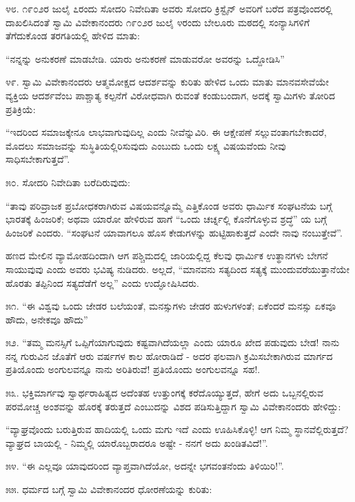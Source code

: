 ೪೮. ೧೯೦೨ರ ಜುಲೈ ೭ರಂದು ಸೋದರಿ ನಿವೇದಿತಾ ಅವರು ಸೋದರಿ ಕ್ರಿಸ್ಟೈನ್ ಅವರಿಗೆ ಬರೆದ ಪತ್ರವೊಂದರಲ್ಲಿ ದಾಖಲಿಸಿದಂತೆ ಸ್ವಾಮಿ ವಿವೇಕಾನಂದರು ೧೯೦೨ರ ಜುಲೈ ೪ರಂದು ಬೇಲೂರು ಮಠದಲ್ಲಿ ಸಂನ್ಯಾಸಿಗಳಿಗೆ ತೆಗೆದುಕೊಂಡ ತರಗತಿಯಲ್ಲಿ ಹೇಳಿದ ಮಾತು:

“ನನ್ನನ್ನು ಅನುಕರಣೆ ಮಾಡಬೇಡಿ. ಯಾರು ಅನುಕರಣೆ ಮಾಡುವರೋ ಅವರನ್ನು ಒದ್ದೋಡಿಸಿ” 

೪೯. ಸ್ವಾಮಿ ವಿವೇಕಾನಂದರು ಆತ್ಮಮೋಕ್ಷದ ಆದರ್ಶವನ್ನು ಕುರಿತು ಹೇಳಿದ ಒಂದು ಮಾತು ಮಾನವಸೇವೆಯೇ ವ್ಯಕ್ತಿಯ ಆದರ್ಶವೆಂಬ ಪಾಶ್ಚಾತ್ಯ ಕಲ್ಪನೆಗೆ ವಿರೋಧವಾಗಿ ರುವಂತೆ ಕಂಡುಬಂದಾಗ, ಅದಕ್ಕೆ ಸ್ವಾಮಿಗಳು ತೋರಿದ ಪ್ರತಿಕ್ರಿಯೆ:

“ಇದರಿಂದ ಸಮಾಜಕ್ಕೇನೂ ಲಾಭವಾಗುವುದಿಲ್ಲ ಎಂದು ನೀವೆನ್ನುವಿರಿ. ಈ ಆಕ್ಷೇಪಣೆ ಸಲ್ಲುವಂತಾಗಬೇಕಾದರೆ, ಮೊದಲು ಸಮಾಜವನ್ನು ಸುಸ್ಥಿತಿಯಲ್ಲಿರಿಸುವುದು ಎಂಬುದು ಒಂದು ಲಕ್ಷ್ಯ ವಿಷಯವೆಂದು ನೀವು ಸಾಧಿಸಬೇಕಾಗುತ್ತದೆ”. 

೫೦. ಸೋದರಿ ನಿವೇದಿತಾ ಬರೆದಿರುವುದು:

“ತಾವು ಪರಿವ್ರಾಜಕ ಪ್ರಬೋಧಕರಾಗಿರುವ ವಿಷಯವನ್ನೊಮ್ಮೆ ಎತ್ತಿಕೊಂಡ ಅವರು ಧಾರ್ಮಿಕ ಸಂಘಟನೆಯ ಬಗ್ಗೆ ಭಾರತಕ್ಕೆ ಹಿಂಜರಿಕೆ; ಅಥವಾ ಯಾರೋ ಹೇಳಿರುವ ಹಾಗೆ “ಒಂದು ಚರ್ಚ್ನಲ್ಲಿ ಕೊನೆಗೊಳ್ಳುವ ಶ್ರದ್ಧೆ” ಯ ಬಗ್ಗೆ ಹಿಂಜರಿಕೆ ಎಂದರು. “ಸಂಘಟನೆ ಯಾವಾಗಲೂ ಹೊಸ ಕೇಡುಗಳನ್ನು ಹುಟ್ಟಿಹಾಕುತ್ತದೆ ಎಂದೇ ನಾವು ನಂಬುತ್ತೇವೆ”.

ಹಣದ ಮೇಲಿನ ವ್ಯಾಮೋಹದಿಂದಾಗಿ ಆಗ ಪಶ್ಚಿಮದಲ್ಲಿ ಜಾರಿಯಲ್ಲಿದ್ದ ಕೆಲವು ಧಾರ್ಮಿಕ ಉತ್ಥಾನಗಳು ಬೇಗನೆ ಸಾಯುವುವು ಎಂದು ಅವರು ಭವಿಷ್ಯ ನುಡಿದರು. ಅಲ್ಲದೆ, “ಮಾನವನು ಸತ್ಯದಿಂದ ಸತ್ಯಕ್ಕೆ ಮುಂದುವರೆಯುತ್ತಾನೆಯೇ ಹೊರತು ತಪ್ಪಿನಿಂದ ಸತ್ಯದೆಡೆಗೆ ಅಲ್ಲ” ಎಂದು ಉದ್ಘೋಷಿಸಿದರು. 

೫೧. “ಈ ವಿಶ್ವವು ಒಂದು ಜೇಡರ ಬಲೆಯಂತೆ, ಮನಸ್ಸುಗಳು ಜೇಡರ ಹುಳುಗಳಂತೆ; ಏಕೆಂದರೆ ಮನಸ್ಸು ಏಕವೂ ಹೌದು, ಅನೇಕವೂ ಹೌದು” 

೫೨. “ತಮ್ಮ ಮನಸ್ಸಿಗೆ ಒಪ್ಪಿಗೆಯಾಗುವುದು ಕಷ್ಟವಾಗಿದೆಯಲ್ಲಾ ಎಂದು ಯಾರೂ ಖೇದ ಪಡುವುದು ಬೇಡ! ನಾನು ನನ್ನ ಗುರುವಿನ ಜೊತೆಗೆ ಆರು ವರ್ಷಗಳ ಕಾಲ ಹೋರಾಡಿದೆ - ಅದರ ಫಲವಾಗಿ ಕ್ರಮಿಸಬೇಕಾಗಿರುವ ಮಾರ್ಗದ ಪ್ರತಿಯೊಂದು ಅಂಗುಲವನ್ನೂ ನಾನು ಅರಿತಿರುವೆ! ಪ್ರತಿಯೊಂದು ಅಂಗುಲವನ್ನೂ ಸಹ!. 

೫೩. ಭಕ್ತಿಮಾರ್ಗವು ಸ್ವಾರ್ಥರಾಹಿತ್ಯದ ಅದೆಂತಹ ಉತ್ತುಂಗಕ್ಕೆ ಕರೆದೊಯ್ಯುತ್ತದೆ, ಹೇಗೆ ಅದು ಒಬ್ಬನಲ್ಲಿರುವ ಪರಮೋಚ್ಚ ಅಂಶವನ್ನು ಹೊರಕ್ಕೆ ತರುತ್ತದೆ ಎಂಬುದನ್ನು ವಿಶದ ಪಡಿಸುತ್ತಿದ್ದಾಗ ಸ್ವಾಮಿ ವಿವೇಕಾನಂದರು ಹೇಳಿದ್ದು:

“ವ್ಯಾಘ್ರವೊಂದು ಬರುತ್ತಿರುವ ಹಾದಿಯಲ್ಲಿ ಒಂದು ಮಗು ಇದೆ ಎಂದು ಊಹಿಸಿಕೊಳ್ಳಿ! ಆಗ ನಿಮ್ಮ ಸ್ಥಾನವೆಲ್ಲಿರುತ್ತದೆ? ವ್ಯಾಘ್ರದ ಬಾಯಲ್ಲಿ - ನಿಮ್ಮಲ್ಲಿ ಯಾರೊಬ್ಬರಾದರೂ ಅಷ್ಟೇ - ನನಗೆ ಅದು ಖಂಡಿತವಿದೆ!”. 

೫೪. “ಈ ಎಲ್ಲವೂ ಯಾವುದರಿಂದ ವ್ಯಾಪ್ತವಾಗಿದೆಯೋ, ಅದನ್ನೇ ಭಗವಂತನೆಂದು ತಿಳಿಯಿರಿ!”. 

೫೫. ಧರ್ಮದ ಬಗ್ಗೆ ಸ್ವಾಮಿ ವಿವೇಕಾನಂದರ ಧೋರಣೆಯನ್ನು ಕುರಿತು:

